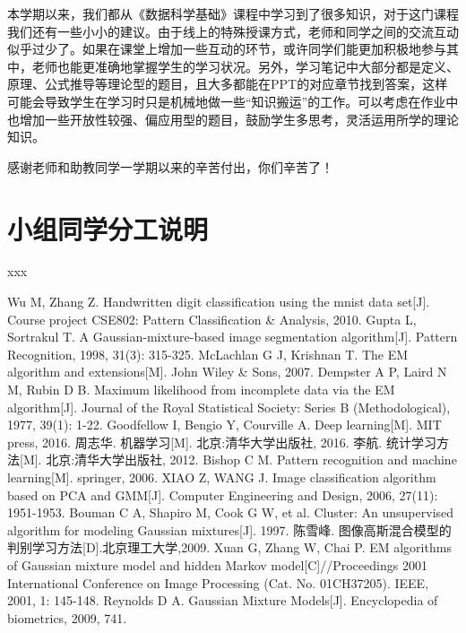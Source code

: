 \documentclass[UTF8]{ctexart}
\begin{document}
本学期以来，我们都从《数据科学基础》课程中学习到了很多知识，对于这门课程我们还有一些小小的建议。由于线上的特殊授课方式，老师和同学之间的交流互动似乎过少了。如果在课堂上增加一些互动的环节，或许同学们能更加积极地参与其中，老师也能更准确地掌握学生的学习状况。另外，学习笔记中大部分都是定义、原理、公式推导等理论型的题目，且大多都能在PPT的对应章节找到答案，这样可能会导致学生在学习时只是机械地做一些“知识搬运”的工作。可以考虑在作业中也增加一些开放性较强、偏应用型的题目，鼓励学生多思考，灵活运用所学的理论知识。

感谢老师和助教同学一学期以来的辛苦付出，你们辛苦了！

\section{小组同学分工说明}
xxx

\begin{thebibliography}{99}
	Wu M, Zhang Z. Handwritten digit classification using the mnist data set[J]. Course project CSE802: Pattern Classification \& Analysis, 2010.
	Gupta L, Sortrakul T. A Gaussian-mixture-based image segmentation algorithm[J]. Pattern Recognition, 1998, 31(3): 315-325.
	McLachlan G J, Krishnan T. The EM algorithm and extensions[M]. John Wiley \& Sons, 2007. 
	Dempster A P, Laird N M, Rubin D B. Maximum likelihood from incomplete data via the EM algorithm[J]. Journal of the Royal Statistical Society: Series B (Methodological), 1977, 39(1): 1-22. 
	Goodfellow I, Bengio Y, Courville A. Deep learning[M]. MIT press, 2016.
	周志华. 机器学习[M]. 北京:清华大学出版社, 2016.
	李航. 统计学习方法[M]. 北京:清华大学出版社, 2012.
	Bishop C M. Pattern recognition and machine learning[M]. springer, 2006.
	XIAO Z, WANG J. Image classification algorithm based on PCA and GMM[J]. Computer Engineering and Design, 2006, 27(11): 1951-1953.
	Bouman C A, Shapiro M, Cook G W, et al. Cluster: An unsupervised algorithm for modeling Gaussian mixtures[J]. 1997.
	陈雪峰. 图像高斯混合模型的判别学习方法[D].北京理工大学,2009.
	Xuan G, Zhang W, Chai P. EM algorithms of Gaussian mixture model and hidden Markov model[C]//Proceedings 2001 International Conference on Image Processing (Cat. No. 01CH37205). IEEE, 2001, 1: 145-148.
	Reynolds D A. Gaussian Mixture Models[J]. Encyclopedia of biometrics, 2009, 741.


\end{thebibliography}
\end{document}
